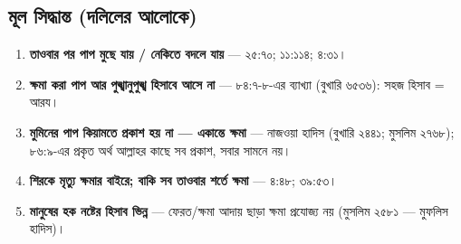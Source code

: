 \subsection*{মূল সিদ্ধান্ত (দলিলের আলোকে)}

\begin{enumerate}
\item \textbf{তাওবার পর পাপ মুছে যায় / নেকিতে বদলে যায়} — ২৫:৭০; ১১:১১৪; ৪:৩১।
\item \textbf{ক্ষমা করা পাপ আর পুঙ্খানুপুঙ্খ হিসাবে আসে না} — ৮৪:৭-৮-এর ব্যাখ্যা (বুখারি ৬৫৩৬): সহজ হিসাব = আরয।
\item \textbf{মুমিনের পাপ কিয়ামতে প্রকাশ হয় না — একান্তে ক্ষমা} — নাজওয়া হাদিস (বুখারি ২৪৪১; মুসলিম ২৭৬৮); ৮৬:৯-এর প্রকৃত অর্থ আল্লাহর কাছে সব প্রকাশ, সবার সামনে নয়।
\item \textbf{শিরকে মৃত্যু ক্ষমার বাইরে; বাকি সব তাওবার শর্তে ক্ষমা} — ৪:৪৮; ৩৯:৫৩।
\item \textbf{মানুষের হক নষ্টের হিসাব ভিন্ন} — ফেরত/ক্ষমা আদায় ছাড়া ক্ষমা প্রযোজ্য নয় (মুসলিম ২৫৮১ — মুফলিস হাদিস)।
\end{enumerate}


